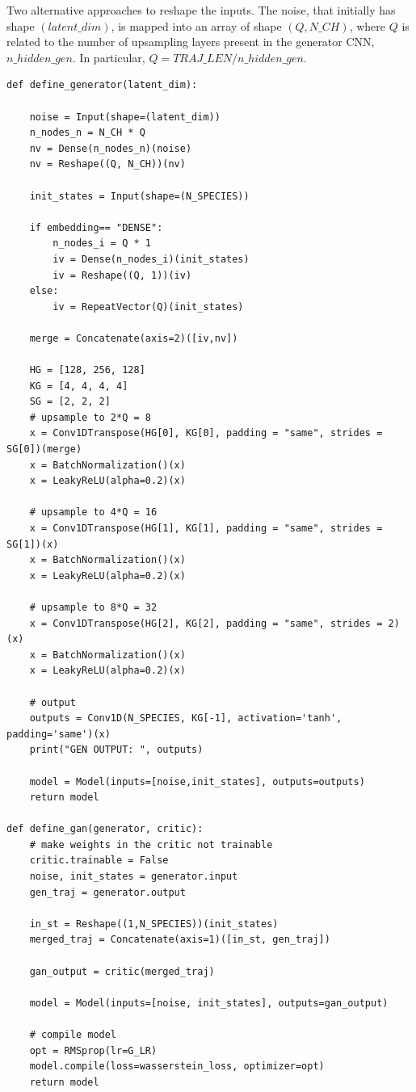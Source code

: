\documentclass{article}
\begin{document}
Two alternative approaches to reshape the inputs. The noise, that initially has shape $(latent\_dim)$, is mapped into an array of shape $(Q,N\_CH)$, where $Q$ is related to the number of upsampling layers present in the generator CNN, $n\_hidden\_gen$. In particular, $Q = TRAJ\_LEN/n\_hidden\_gen$.
\begin{lstlisting}
def define_generator(latent_dim):
	
	noise = Input(shape=(latent_dim)) 
	n_nodes_n = N_CH * Q
	nv = Dense(n_nodes_n)(noise)
	nv = Reshape((Q, N_CH))(nv)

	init_states = Input(shape=(N_SPECIES))
	
	if embedding== "DENSE":
		n_nodes_i = Q * 1
		iv = Dense(n_nodes_i)(init_states)
		iv = Reshape((Q, 1))(iv)
	else:
		iv = RepeatVector(Q)(init_states)

	merge = Concatenate(axis=2)([iv,nv])

	HG = [128, 256, 128]
	KG = [4, 4, 4, 4]
	SG = [2, 2, 2]
	# upsample to 2*Q = 8
	x = Conv1DTranspose(HG[0], KG[0], padding = "same", strides = SG[0])(merge)
	x = BatchNormalization()(x)
	x = LeakyReLU(alpha=0.2)(x)
	
	# upsample to 4*Q = 16
	x = Conv1DTranspose(HG[1], KG[1], padding = "same", strides = SG[1])(x)
	x = BatchNormalization()(x)
	x = LeakyReLU(alpha=0.2)(x)
	
	# upsample to 8*Q = 32
	x = Conv1DTranspose(HG[2], KG[2], padding = "same", strides = 2)(x)
	x = BatchNormalization()(x)
	x = LeakyReLU(alpha=0.2)(x)
	
	# output
	outputs = Conv1D(N_SPECIES, KG[-1], activation='tanh', padding='same')(x)
	print("GEN OUTPUT: ", outputs)

	model = Model(inputs=[noise,init_states], outputs=outputs)
	return model

def define_gan(generator, critic):
	# make weights in the critic not trainable
	critic.trainable = False
	noise, init_states = generator.input
	gen_traj = generator.output

	in_st = Reshape((1,N_SPECIES))(init_states)
	merged_traj = Concatenate(axis=1)([in_st, gen_traj])

	gan_output = critic(merged_traj)

	model = Model(inputs=[noise, init_states], outputs=gan_output)

	# compile model
	opt = RMSprop(lr=G_LR)
	model.compile(loss=wasserstein_loss, optimizer=opt)
	return model
\end{lstlisting}
\end{document}
